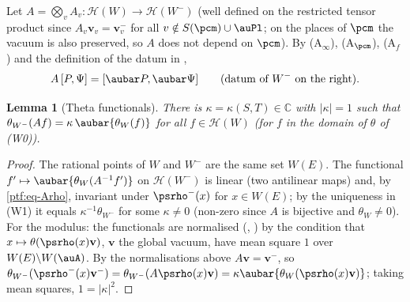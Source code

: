 \documentclass[10pt]{amsart}
\newtheorem{lemma}[theorem]{Lemma}
\theoremstyle{definition}
\theoremstyle{remark}
\newcommand{\C}{\mathbb C}
\providecommand{\psHS}{\mathcal H}
\providecommand{\psvac}{\mathbf v}
\begin{document}
Let $A=\bigotimes_vA_v\colon\psHS(W)\to\psHS(W^-)$ (well defined on the restricted tensor product since
$A_v\psvac_v=\psvac^-_v$ for all $v\notin S(\pcm)\cup\auPl$; on the places of $\pcm$ the vacuum is also
preserved, so $A$ does not depend on $\pcm$). By (A$_\infty$), (A$_\pcm$), (A$_f$) and the definition of
the datum in {\cite[\S2.3]{P53}},
\begin{equation}\label{ptf:eq-Adatum}
A\,[P,\Psi]=[\aubar P,\aubar\Psi]\qquad\text{(datum of }W^-\text{ on the right)}.
\end{equation}

\begin{lemma}[Theta functionals]\label{ptf:theta}
There is $\kappa=\kappa(S,T)\in\C$ with $|\kappa|=1$ such that $\theta_{W^-}(Af)=\kappa\,\aubar{\theta_W(f)}$
for all $f\in\psHS(W)$ (for $f$ in the domain of $\theta$ of (W0)).
\end{lemma}
\begin{proof}
The rational points of $W$ and $W^-$ are the same set $W(E)$. The functional $f'\mapsto
\aubar{\theta_W(A^{-1}f')}$ on $\psHS(W^-)$ is linear (two antilinear maps) and, by \eqref{ptf:eq-Arho},
invariant under $\psrho^-(x)$ for $x\in W(E)$; by the uniqueness in (W1) it equals $\kappa^{-1}\theta_{W^-}$
for some $\kappa\ne0$ (non-zero since $A$ is bijective and $\theta_W\neq0$). For the modulus: the
functionals are normalised ({\cite[\S5.1.1]{P49}}, {\cite[\S2.3]{P53}}) by the condition that $x\mapsto
\theta(\psrho(x)\psvac)$, $\psvac$ the global vacuum, have mean square $1$ over $W(E)\backslash W(\auA)$.
By the normalisations above $A\psvac=\psvac^-$, so $\theta_{W^-}(\psrho^-(x)\psvac^-)=\theta_{W^-}(A\psrho(x)
\psvac)=\kappa\aubar{\theta_W(\psrho(x)\psvac)}$; taking mean squares, $1=|\kappa|^2$.
\end{proof}
\end{document}

